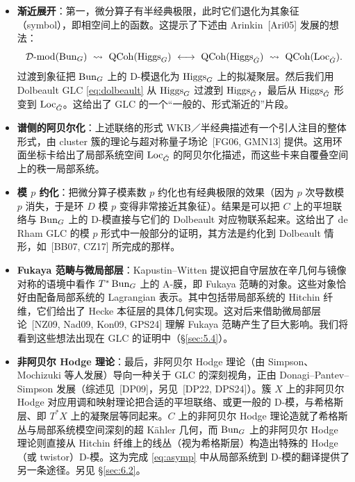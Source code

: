 \begin{itemize}
\item \textbf{渐近展开}：第一，微分算子有半经典极限，此时它们退化为其象征（symbol），即相空间上的函数。这提示了下述由 Arinkin~[Ari05] 发展的想法：
\begin{equation}\label{eq:asymp}
\Dmod(\Bun_{G})\ \rightsquigarrow\ \QCoh(\Higgs_{G})\ \longleftrightarrow\ \QCoh(\Higgs_{\Gd})\ \rightsquigarrow\ \QCoh(\Loc_{\Gd}).
\end{equation}
过渡到象征把 $\operatorname{Bun}_{G}$ 上的 D-模退化为 $\operatorname{Higgs}_{G}$ 上的拟凝聚层。然后我们用 Dolbeault GLC \eqref{eq:dolbeault} 从 $\operatorname{Higgs}_{G}$ 过渡到 $\operatorname{Higgs}_{\check{G}}$，最后从 $\operatorname{Higgs}_{\check{G}}$ 形变到 $\operatorname{Loc}_{\check{G}}$。这给出了 GLC 的一个“一般的、形式渐近的”片段。
\item \textbf{谱侧的阿贝尔化}：上述联络的形式 WKB／半经典描述有一个引人注目的整体形式，由 cluster 簇的理论与超对称量子场论~[FG06, GMN13] 提供。这用环面坐标卡给出了局部系统空间 $\operatorname{Loc}_{\check{G}}$ 的阿贝尔化描述，而这些卡来自覆叠空间上的秩一局部系统。
\item \textbf{模 $p$ 约化}：把微分算子模素数 $p$ 约化也有经典极限的效果（因为 $p$ 次导数模 $p$ 消失，于是环 $D$ 模 $p$ 变得非常接近其象征）。结果是可以把 $C$ 上的平坦联络与 $\operatorname{Bun}_{G}$ 上的 D-模直接与它们的 Dolbeault 对应物联系起来。这给出了 de Rham GLC 的模 $p$ 形式中一般部分的证明，其方法是约化到 Dolbeault 情形，如~[BB07, CZ17] 所完成的那样。
\item \textbf{Fukaya 范畴与微局部层}：Kapustin–Witten 提议把自守层放在辛几何与镜像对称的语境中看作 $T^{*}\operatorname{Bun}_{G}$ 上的 A-膜，即 Fukaya 范畴的对象。这些对象恰好由配备局部系统的 Lagrangian 表示。其中包括带局部系统的 Hitchin 纤维，它们给出了 Hecke 本征层的具体几何实现。这对后来借助微局部层论~[NZ09, Nad09, Kon09, GPS24] 理解 Fukaya 范畴产生了巨大影响。我们将看到这些想法出现在 GLC 的证明中（\S\ref{sec:5.4}）。
\item \textbf{非阿贝尔 Hodge 理论}：最后，非阿贝尔 Hodge 理论（由 Simpson、Mochizuki 等人发展）导向一种关于 GLC 的深刻视角，正由 Donagi–Pantev–Simpson 发展（综述见~[DP09]，另见~[DP22, DPS24]）。簇 $X$ 上的非阿贝尔 Hodge 对应用调和映射理论把合适的平坦联络、或更一般的 D-模，与希格斯层、即 $T^{*}X$ 上的凝聚层等同起来。$C$ 上的非阿贝尔 Hodge 理论造就了希格斯丛与局部系统模空间深刻的超 Kähler 几何，而 $\operatorname{Bun}_{G}$ 上的非阿贝尔 Hodge 理论则直接从 Hitchin 纤维上的线丛（视为希格斯层）构造出特殊的 Hodge（或 twistor）D-模。这为完成 \eqref{eq:asymp} 中从局部系统到 D-模的翻译提供了另一条途径。另见 \S\ref{sec:6.2}。
\end{itemize}
